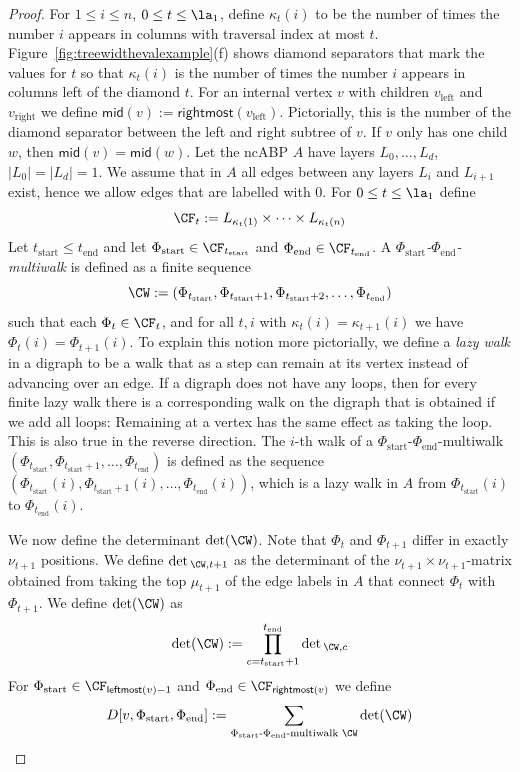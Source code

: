 \begin{proof}
For $1 \leq i \leq n$, $0 \leq t \leq \la_1$, define $\kappa_t(i)$ to be the number of times the number $i$ appears in columns with traversal index at most $t$. Figure~\ref{fig:treewidthevalexample}(f) shows diamond separators that mark the values for $t$ so that $\kappa_t(i)$ is the number of times the number $i$ appears in columns left of the diamond $t$. For an internal vertex $v$ with children $v_\text{left}$ and $v_\text{right}$ we define $\textsf{mid}(v) := \textsf{rightmost}(v_\text{left})$. Pictorially, this is the number of the diamond separator between the left and right subtree of $v$. If $v$ only has one child $w$, then $\textsf{mid}(v) = \textsf{mid}(w)$.
Let the ncABP $A$ have layers $L_0, \ldots, L_d$, $|L_0|=|L_d|=1$. We assume that in $A$ all edges between any layers $L_i$ and $L_{i+1}$ exist, hence we allow edges that are labelled with 0.
For $0 \leq t \leq \la_1$ define
\[
\CF_t := L_{\kappa_{t}(1)} \times \cdots \times L_{\kappa_{t}(n)}
\]
%
Let $t_\text{start} \leq t_\text{end}$ and let $\Phi_\text{start} \in \CF_{t_\text{start}}$ and $\Phi_\text{end} \in \CF_{t_\text{end}}$.
A \emph{$\Phi_\text{start}$-$\Phi_\text{end}$-multiwalk} is defined as a finite sequence
\[
\CW := (\Phi_{t_\text{start}}, \Phi_{t_\text{start}+1}, \Phi_{t_\text{start}+2}, \ldots, \Phi_{t_\text{end}})
\]
such that each $\Phi_{t} \in \CF_t$, and for all $t,i$ with $\kappa_t(i)=\kappa_{t+1}(i)$ we have $\Phi_{t}(i)=\Phi_{t+1}(i)$.
To explain this notion more pictorially, we define
a \emph{lazy walk} in a digraph to be a walk that as a step can remain at its vertex instead of advancing over an edge. If a digraph does not have any loops, then for every finite lazy walk there is a corresponding walk on the digraph that is obtained if we add all loops: Remaining at a vertex has the same effect as taking the loop. This is also true in the reverse direction.
The $i$-th walk of a $\Phi_\text{start}$-$\Phi_\text{end}$-multiwalk
$(\Phi_{t_\text{start}}, \Phi_{t_\text{start}+1}, \ldots, \Phi_{t_\text{end}})$
is defined as the sequence
$(\Phi_{t_\text{start}}(i), \Phi_{t_\text{start}+1}(i), \ldots, \Phi_{t_\text{end}}(i))$,
which is a lazy walk in $A$ from $\Phi_{t_\text{start}}(i)$ to $\Phi_{t_\text{end}}(i)$.

We now define the determinant $\det(\CW)$.
Note that $\Phi_{t}$ and $\Phi_{t+1}$ differ in exactly $\nu_{t+1}$ positions.
We define $\det{}_{\CW,t+1}$ as the determinant of the $\nu_{t+1}\times \nu_{t+1}$-matrix obtained from taking the top $\mu_{t+1}$ of the edge labels in $A$ that connect $\Phi_{t}$ with $\Phi_{t+1}$.
We define $\det(\CW)$ as
\[
\det(\CW) := \prod_{c=t_\text{start}+1}^{t_\text{end}}\det{}_{\CW,c}
\]
For $\Phi_\text{start} \in \CF_{\textsf{leftmost}(v)-1}$ and $\Phi_\text{end} \in \CF_{\textsf{rightmost}(v)}$ we define
\begin{equation}\label{def:D}
D[v,\Phi_\text{start},\Phi_\text{end}] :=
\sum_{\Phi_\text{start}\text{-}\Phi_\text{end}\text{-multiwalk } \CW} \det(\CW) \end{equation}


\end{proof}
